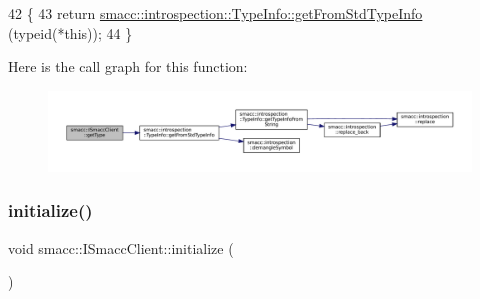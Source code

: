 \begin{DoxyCode}
42 \{
43     \textcolor{keywordflow}{return} \hyperlink{classsmacc_1_1introspection_1_1TypeInfo_ada1e604cd8bf968a5f816fbace4af881}{smacc::introspection::TypeInfo::getFromStdTypeInfo}
      (\textcolor{keyword}{typeid}(*\textcolor{keyword}{this}));
44 \}
\end{DoxyCode}
Here is the call graph for this function\+:
\nopagebreak
\begin{figure}[H]
\begin{center}
\leavevmode
\includegraphics[width=350pt]{classsmacc_1_1ISmaccClient_ae7faf4e40510c73810e6b0ef9fec8f33_cgraph}
\end{center}
\end{figure}
\mbox{\label{classsmacc_1_1ISmaccClient_a974ebb6ad6cf812e7b9de6b78b3d901f}} 
\subsubsection{\texorpdfstring{initialize()}{initialize()}}
{\footnotesize\ttfamily void smacc\+::\+I\+Smacc\+Client\+::initialize (\begin{DoxyParamCaption}{ }\end{DoxyParamCaption})\hspace{0.3cm}{\ttfamily [virtual]}}



